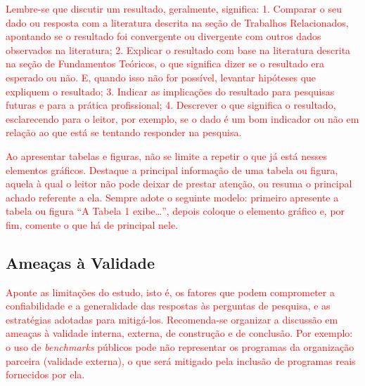 \textcolor{red}{Lembre-se que discutir um resultado, geralmente, significa: 1. Comparar o seu dado ou resposta com a literatura descrita na seção de Trabalhos Relacionados, apontando se o resultado foi convergente ou divergente com outros dados observados na literatura; 2. Explicar o resultado com base na literatura descrita na seção de Fundamentos Teóricos, o que significa dizer se o resultado era esperado ou não. E, quando isso não for possível, levantar hipóteses que expliquem o resultado; 3. Indicar as implicações do resultado para pesquisas futuras e para a prática profissional; 4. Descrever o que significa o resultado, esclarecendo para o leitor, por exemplo, se o dado é um bom indicador ou não em relação ao que está se tentando responder na pesquisa.}

\textcolor{red}{Ao apresentar tabelas e figuras, não se limite a repetir o que já está nesses elementos gráficos. Destaque a principal informação de uma tabela ou figura, aquela à qual o leitor não pode deixar de prestar atenção, ou resuma o principal achado referente a ela. Sempre adote o seguinte modelo: primeiro apresente a tabela ou figura {“A Tabela 1 exibe…”}, depois coloque o elemento gráfico e, por fim, comente o que há de principal nele.}


\subsection{Ameaças à Validade}
\label{sub:ameacas-validade}

\textcolor{red}{Aponte as limitações do estudo, isto é, os fatores que podem comprometer a confiabilidade e a generalidade das respostas às perguntas de pesquisa, e as estratégias adotadas para mitigá-los. Recomenda-se organizar a discussão em ameaças à validade interna, externa, de construção e de conclusão. Por exemplo: o uso de \textit{benchmarks} públicos pode não representar os programas da organização parceira (validade externa), o que será mitigado pela inclusão de programas reais fornecidos por ela.}
